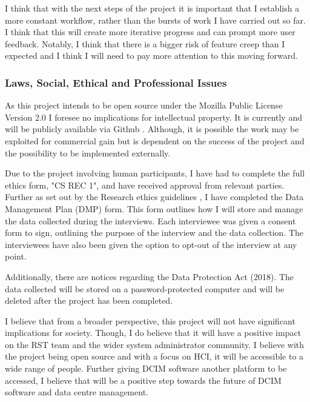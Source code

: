 \documentclass [11pt,a4paper]{article}
\begin{document}
I think that with the next steps of the project it is important that I establish a more constant workflow, rather than the bursts of work I have carried out so far. I think that this will create more iterative progress and can prompt more user feedback. Notably, I think that there is a bigger risk of feature creep than I expected and I think I will need to pay more attention to this moving forward.

\subsubsection{Laws, Social, Ethical and Professional Issues}
\label{sec:computer_laws}
As this project intends to be open source under the Mozilla Public License Version 2.0 I foresee no implications for intellectual property. It is currently and will be publicly available via Github \cite{keeptrackgithub}. Although, it is possible the work may be exploited for commercial gain but is dependent on the success of the project and the possibility to be implemented externally.

Due to the project involving human participants, I have had to complete the full ethics form, "CS REC 1", and have received approval from relevant parties. Further as set out by the Research ethics guidelines \cite{ethicsguidelines}, I have completed the Data Management Plan (DMP) form. This form outlines how I will store and manage the data collected during the interviews. Each interviewee was given a consent form to sign, outlining the purpose of the interview and the data collection. The interviewees have also been given the option to opt-out of the interview at any point.

Additionally, there are notices regarding the Data Protection Act (2018). The  data collected will be stored on a password-protected computer and will be deleted after the project has been completed.

I believe that from a broader perspective, this project will not have significant implications for society. Though, I do believe that it will have a positive impact on the RST team and the wider system administrator community. I believe with the project being open source and with a focus on HCI, it will be accessible to a wide range of people. Further giving DCIM software another platform to be accessed, I believe that will be a positive step towards the future of DCIM software and data centre management.

\pagebreak


 
\end{document}
